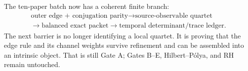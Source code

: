 \documentclass[12pt]{article}
\theoremstyle{remark}
\begin{document}
The ten-paper batch now has a coherent finite branch:
\begin{equation*}
 \begin{gathered}
 \text{outer edge + conjugation parity}
 \longrightarrow\text{source-observable quartet}\\
 \longrightarrow\text{balanced exact packet}
 \longrightarrow\text{temporal determinant/trace ledger}.
 \end{gathered}
\end{equation*}
The next barrier is no longer identifying a local quartet.  It is proving
that the edge rule and its channel weights survive refinement and can be
assembled into an intrinsic object.  That is still Gate A; Gates B--E,
Hilbert--P\'olya, and RH remain untouched.



\end{document}
